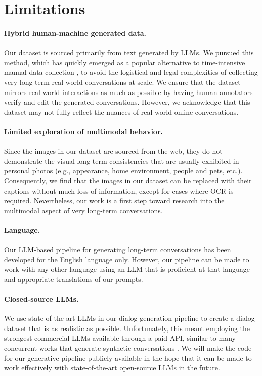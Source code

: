 \section{Limitations}

\paragraph{Hybrid human-machine generated data.} Our dataset is sourced primarily from text generated by LLMs. We pursued this method, which has quickly emerged as a popular alternative to time-intensive manual data collection \cite{kim-etal-2023-soda, jang2023conversation}, to avoid the logistical and legal complexities of collecting very long-term real-world conversations at scale. We ensure that the dataset mirrors real-world interactions as much as possible by having human annotators verify and edit the generated conversations. However, we acknowledge that this dataset may not fully reflect the nuances of real-world online conversations. 

\paragraph{Limited exploration of multimodal behavior.} Since the images in our dataset are sourced from the web, they do not demonstrate the visual long-term consistencies that are usually exhibited in personal photos (e.g., appearance, home environment, people and pets, etc.). Consequently, we find that the images in our dataset can be replaced with their captions without much loss of information, except for cases where OCR is required. Nevertheless, our work is a first step toward research into the multimodal aspect of very long-term conversations.

\paragraph{Language.} Our LLM-based pipeline for generating long-term conversations has been developed for the English language only. However, our pipeline can be made to work with any other language using an LLM that is proficient at that language and appropriate translations of our prompts.

\paragraph{Closed-source LLMs.} We use state-of-the-art LLMs in our dialog generation pipeline to create a dialog dataset that is as realistic as possible. Unfortunately, this meant employing the strongest commercial LLMs available through a paid API, similar to many concurrent works that generate synthetic conversations \cite{zhong2023memorybank, lu2023memochat}. We will make the code for our generative pipeline publicly available in the hope that it can be made to work effectively with state-of-the-art open-source LLMs in the future.

